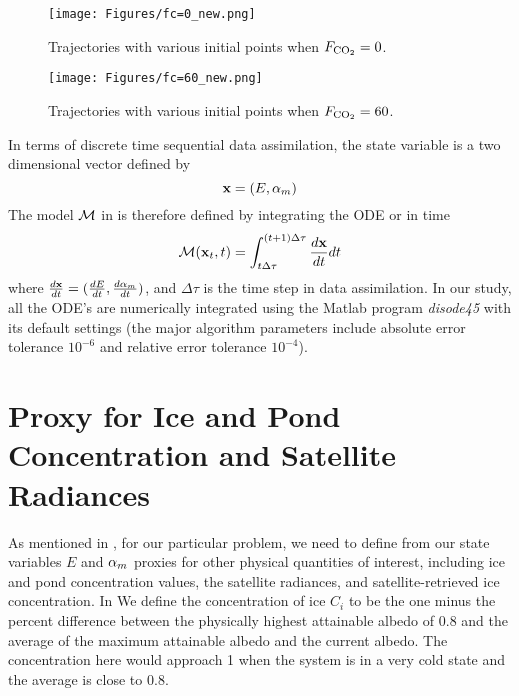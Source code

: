 \begin{figure}\label{fig:fczero}
\begin{center}
\texttt{[image: Figures/fc=0\_new.png]} 
\end{center}
\caption{Trajectories with various initial points when $F_{\text{CO}_2}=0$.}
\end{figure}

\begin{figure}\label{fig:fcsixty}
\begin{center}
\texttt{[image: Figures/fc=60\_new.png]} 
\end{center}
\caption{Trajectories with various initial points when $F_{\text{CO}_2}=60$.}
\end{figure}

\par In terms of discrete time sequential data assimilation, the state variable is a two dimensional vector defined by
\begin{equation}\label{eq:xdef}
\textbf{x} = (E, \alpha_m )
\end{equation}
The model $\mathcal{M}$ in  is therefore defined by integrating the ODE  or  in time
\begin{equation}\label{eq:modeldef}
\mathcal{M}(\textbf{x}_t,t) = \int_{t\Delta\tau}^{(t+1)\Delta\tau} \frac{d\textbf{x}}{dt} dt
\end{equation}
where $\frac{d\textbf{x}}{dt} = (\frac{dE}{dt},\frac{d\alpha_m}{dt})$, and $\Delta\tau$ is the time step in data assimilation. In our study, all the ODE's are numerically integrated using the Matlab program {\it disode45} \cite{disode45} with its default settings (the major algorithm parameters include absolute error tolerance $10^{-6}$ and relative error tolerance $10^{-4}$).

\section{Proxy for Ice and Pond Concentration and Satellite Radiances}\label{sec:radiancedef}

\par As mentioned in , for our particular problem, we need to define from our state variables $E$ and $\alpha_m$ proxies for other physical quantities of interest, including ice and pond concentration values, the satellite radiances, and satellite-retrieved ice concentration. In  We define the concentration of ice $C_i$ to be the one minus the percent difference between the physically highest attainable albedo of $0.8$ and the average of the maximum attainable albedo and the current albedo. The concentration here would approach 1 when the system is in a very cold state and the average is close to $0.8$.

